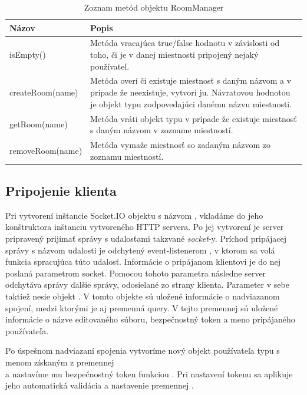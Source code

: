 \begin{table}
	\begin{tabular}{ | m{4cm} | m{8.5cm} | } \hline
		\textbf{Názov} & \textbf{Popis} \\ \hline \hline
		
		isEmpty() & Metóda vracajúca true/false hodnotu v závislosti od toho, či je v danej miestnosti pripojený nejaký používateľ. \\\hline
		createRoom(name) & Metóda overí či existuje miestnosť s daným názvom a v prípade že neexistuje, vytvorí ju. Návratovou hodnotou je objekt typu \code{Room} zodpovedajúci danému názvu miestnosti. \\\hline
		getRoom(name) & Metóda vráti objekt typu \code{Room} v prípade že existuje miestnosť s daným názvom v zozname miestností. \\\hline
		removeRoom(name) & Metóda vymaže miestnosť so zadaným názvom zo zoznamu miestností. \\\hline
		
		\hline
	\end{tabular}
	\caption{Zoznam metód objektu RoomManager}
	\label{tab:server-func-roommanager}
\end{table}
\FloatBarrier

\subsection{Pripojenie klienta}

Pri vytvorení inštancie Socket.IO objektu s názvom , vkladáme do jeho konštruktora inštanciu vytvoreného HTTP servera. Po jej vytvorení je server pripravený prijímať správy s udalosťami takzvané \textit{socket}-y. Príchod pripájacej správy s názvom udalosti   je odchytený event-listenerom  , v ktorom sa volá funkcia spracujúca túto udalosť. Informácie o pripájanom klientovi je do nej poslaná parametrom socket. Pomocou tohoto parametra následne server odchytáva správy ďalšie správy, odosielané zo strany klienta. Parameter v sebe taktiež nesie objekt . V tomto objekte sú uložené informácie o nadviazanom spojení, medzi ktorými je aj premenná query. V tejto premennej sú uložené informácie o názve editovaného súboru, bezpečnostný token a meno pripájaného používateľa. 

Po úspešnom nadviazaní spojenia vytvoríme nový objekt používateľa typu  s menom získaným z premennej \\ a nastavíme mu bezpečnostný token funkciou . Pri nastavení tokenu sa aplikuje jeho automatická validácia a nastavenie premennej .


